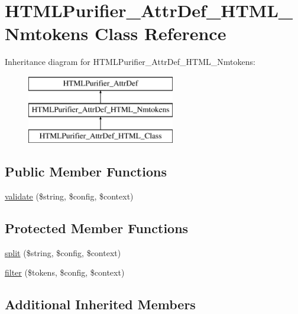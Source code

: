 \hypertarget{classHTMLPurifier__AttrDef__HTML__Nmtokens}{\section{H\+T\+M\+L\+Purifier\+\_\+\+Attr\+Def\+\_\+\+H\+T\+M\+L\+\_\+\+Nmtokens Class Reference}
\label{classHTMLPurifier__AttrDef__HTML__Nmtokens}
}
Inheritance diagram for H\+T\+M\+L\+Purifier\+\_\+\+Attr\+Def\+\_\+\+H\+T\+M\+L\+\_\+\+Nmtokens\+:\begin{figure}[H]
\begin{center}
\leavevmode
\includegraphics[height=3.000000cm]{classHTMLPurifier__AttrDef__HTML__Nmtokens}
\end{center}
\end{figure}
\subsection*{Public Member Functions}
\begin{DoxyCompactItemize}
\item 
\hyperlink{classHTMLPurifier__AttrDef__HTML__Nmtokens_a336b7483eff4c0f5be7ba853d733b0cd}{validate} (\$string, \$config, \$context)
\end{DoxyCompactItemize}
\subsection*{Protected Member Functions}
\begin{DoxyCompactItemize}
\item 
\hyperlink{classHTMLPurifier__AttrDef__HTML__Nmtokens_a4710c3147f3fe1ce1a113c36efcff8ae}{split} (\$string, \$config, \$context)
\item 
\hyperlink{classHTMLPurifier__AttrDef__HTML__Nmtokens_af805b350744daf8aad94045e95ae8b98}{filter} (\$tokens, \$config, \$context)
\end{DoxyCompactItemize}
\subsection*{Additional Inherited Members}


